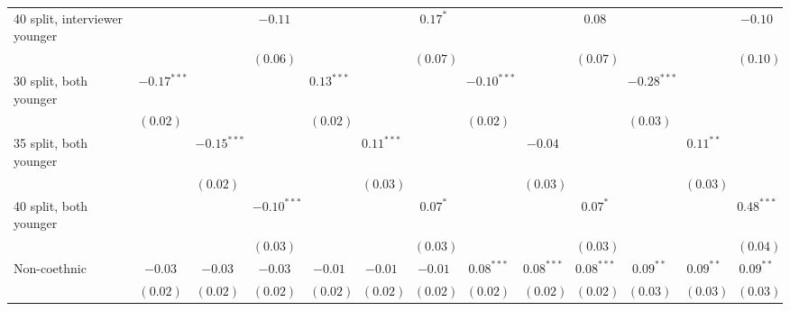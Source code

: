 \begin{table}
\begin{center}
\begin{threeparttable}
\begin{tabular}{l c c c c c c c c c c c c}
40 split, interviewer younger   &               &               & $-0.11$       &               &               & $0.17^{*}$    &               &               & $0.08$        &               &               & $-0.10$       \\
                                &               &               & $(0.06)$      &               &               & $(0.07)$      &               &               & $(0.07)$      &               &               & $(0.10)$      \\
30 split, both younger          & $-0.17^{***}$ &               &               & $0.13^{***}$  &               &               & $-0.10^{***}$ &               &               & $-0.28^{***}$ &               &               \\
                                & $(0.02)$      &               &               & $(0.02)$      &               &               & $(0.02)$      &               &               & $(0.03)$      &               &               \\
35 split, both younger          &               & $-0.15^{***}$ &               &               & $0.11^{***}$  &               &               & $-0.04$       &               &               & $0.11^{**}$   &               \\
                                &               & $(0.02)$      &               &               & $(0.03)$      &               &               & $(0.03)$      &               &               & $(0.03)$      &               \\
40 split, both younger          &               &               & $-0.10^{***}$ &               &               & $0.07^{*}$    &               &               & $0.07^{*}$    &               &               & $0.48^{***}$  \\
                                &               &               & $(0.03)$      &               &               & $(0.03)$      &               &               & $(0.03)$      &               &               & $(0.04)$      \\
Non-coethnic                    & $-0.03$       & $-0.03$       & $-0.03$       & $-0.01$       & $-0.01$       & $-0.01$       & $0.08^{***}$  & $0.08^{***}$  & $0.08^{***}$  & $0.09^{**}$   & $0.09^{**}$   & $0.09^{**}$   \\
                                & $(0.02)$      & $(0.02)$      & $(0.02)$      & $(0.02)$      & $(0.02)$      & $(0.02)$      & $(0.02)$      & $(0.02)$      & $(0.02)$      & $(0.03)$      & $(0.03)$      & $(0.03)$      \\

\end{tabular}
\end{threeparttable}
\end{center}
\end{table}
